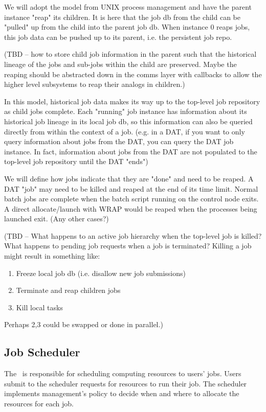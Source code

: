 We will adopt the model from UNIX process management and have the
parent instance "reap" its children. It is here that the job db from
the child can be "pulled" up from the child into the parent job db.
When instance 0 reaps jobs, this job data can be pushed up to its
parent, i.e. the persistent job repo.

(TBD -- how to store child job information in the parent such that the
historical lineage of the jobs and sub-jobs within the child are
preserved.  Maybe the reaping should be abstracted down in the comms
layer with callbacks to allow the higher level subsystems to reap
their analogs in children.)

In this model, historical job data makes its way up to the top-level
job repository as child jobs complete. Each "running" job instance has
information about its historical job lineage in its local job db, so
this information can also be queried directly from within the context
of a job. (e.g. in a DAT, if you want to only query information about
jobs from the DAT, you can query the DAT job instance. In fact,
information about jobs from the DAT are not populated to the top-level
job repository until the DAT "ends")

We will define how jobs indicate that they are "done" and need to be
reaped. A DAT "job" may need to be killed and reaped at the end of its
time limit. Normal batch jobs are complete when the batch script
running on the control node exits. A direct allocate/launch with WRAP
would be reaped when the processes being launched exit. (Any other
cases?)

(TBD -- What happens to an active job hierarchy when the top-level job
is killed?  What happens to pending job requests when a job is
terminated?  Killing a job might result in something like:

\begin{enumerate}
\item Freeze local job db (i.e. disallow new job submissions)
\item Terminate and reap children jobs
\item Kill local tasks
\end{enumerate}

Perhaps 2,3 could be swapped or done in parallel.)

\subsection{Job Scheduler}

The \ngjs\ is responsible for scheduling computing resources to users'
jobs.  Users submit to the scheduler requests for resources to run
their job.  The scheduler implements management's policy to decide
when and where to allocate the resources for each job.

